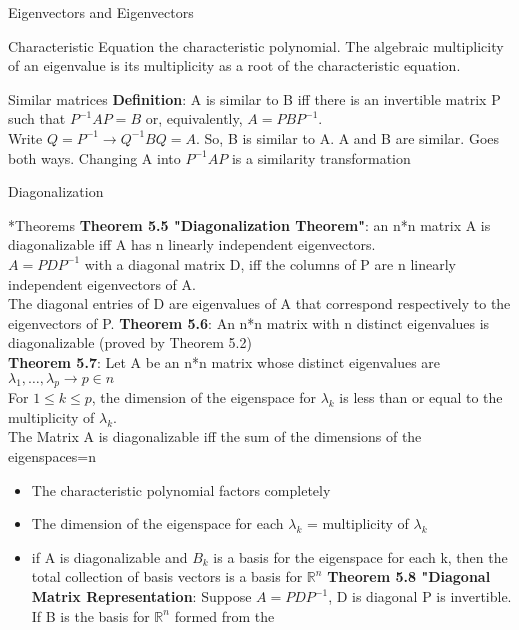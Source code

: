 \documentclass[a4paper, 12pt]{article}
\begin{document}
\begin{section}{Eigenvectors and Eigenvectors}
\begin{subsection}{Characteristic Equation}
the characteristic polynomial. The algebraic multiplicity of an eigenvalue is its
multiplicity as a root of the characteristic equation.
\end{subsection}
\begin{subsection}{Similar matrices}
\textbf{Definition}: A is similar to B iff there is an invertible matrix P such that 
$P^{-1}AP=B$ or, equivalently, $A=PBP^{-1}$.\\
Write $Q=P^{-1} \to Q^{-1}BQ=A$. So, B is similar to A. A and B are similar. Goes both
ways. Changing A into $P^{-1}AP$ is a similarity transformation
\end{subsection}
\end{section}

\newpage
\begin{section}{Diagonalization}
\begin{subsection}*{Theorems}
\textbf{Theorem 5.5 "Diagonalization Theorem"}: an n*n matrix A is diagonalizable iff
A has n linearly independent eigenvectors. \\
$A=PDP^{-1}$ with a diagonal matrix D, iff the columns of P are n linearly independent
eigenvectors of A.\\
The diagonal entries of D are eigenvalues of A that correspond respectively to the
eigenvectors of P.
\noindent \textbf{Theorem 5.6}: An n*n matrix with n distinct eigenvalues is 
diagonalizable (proved by Theorem 5.2) \\
\noindent \textbf{Theorem 5.7}: Let A be an n*n matrix whose distinct eigenvalues are
$\lambda_{1}, \dots, \lambda_{p} \to p \in n$ \\
For $1 \leq k \leq p$, the dimension of the eigenspace for $\lambda_{k}$ is less than
or equal to the multiplicity of $\lambda_{k}$. \\
The Matrix A is diagonalizable iff the sum of the dimensions of the eigenspaces=n\\
\begin{itemize}
\item{The characteristic polynomial factors completely}
\item{The dimension of the eigenspace for each $\lambda_{k}$ = multiplicity of
$\lambda_{k}$}
\item{if A is diagonalizable and $B_{k}$ is a basis for the eigenspace for each k,
then the total collection of basis vectors is a basis for $\mathbb{R}^{n}$}
\noindent \textbf{Theorem 5.8 "Diagonal Matrix Representation}: Suppose $A=PDP^{-1}$,
D is diagonal P is invertible. If B is the basis for $\mathbb{R}^{n}$ formed from the

\end{itemize}
\end{subsection}
\end{section}
\end{document}
